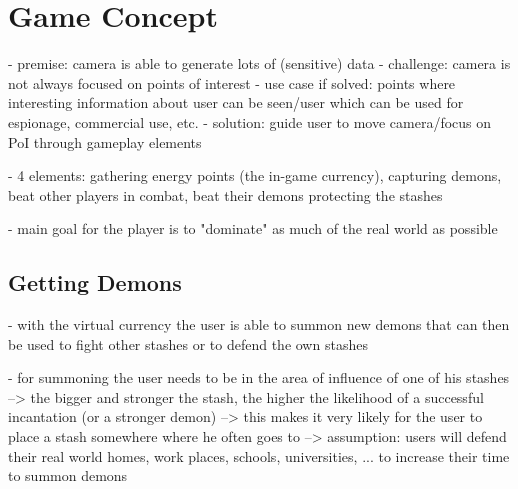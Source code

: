 \section{Game Concept}
\label{sec:concept}

- premise: camera is able to generate lots of (sensitive) data
- challenge: camera is not always focused on points of interest
- use case if solved: points where interesting information about user can be seen/user which can be used for espionage, commercial use, etc.
- solution: guide user to move camera/focus on PoI through gameplay elements



- 4 elements: gathering energy points (the in-game currency), capturing demons, beat other players in combat, beat their demons protecting the stashes

- main goal for the player is to "dominate" as much of the real world as possible



\subsection{Getting Demons}
\label{subsec:demons}

- with the virtual currency the user is able to summon new demons that can then be used to fight other stashes or to defend the own stashes

- for summoning the user needs to be in the area of influence of one of his stashes --> the bigger and stronger the stash, the higher the likelihood of a successful incantation (or a stronger demon)
--> this makes it very likely for the user to place a stash somewhere where he often goes to 
--> assumption: users will defend their real world homes, work places, schools, universities, ... to increase their time to summon demons

